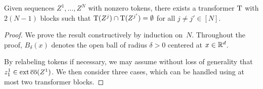 \documentclass[11pt,a4paper]{amsart}
\begin{document}
\begin{lemma}\label{lem:splitOverlappingSequences}
Given sequences $Z^1,\ldots,Z^N$ with nonzero tokens, there exists a transformer $\operatorname{\mathrm{T}}$ with $2 (N-1)$ blocks such that $\operatorname{\mathrm{T}}({Z}^j) \cap \operatorname{\mathrm{T}}({Z}^{j'}) = \emptyset$ for all $j\neq j'\in [N]$.
\end{lemma}
\begin{proof}
We prove the result constructively by induction on~$N$. Throughout the proof, $B_\delta(x)$ denotes the open ball of radius $\delta > 0$ centered at $x\in \mathbb{R}^d$.
\vspace{3mm}

 By relabeling tokens if necessary, we may assume without loss of generality that $z_1^1 \in \operatorname{ext}\operatorname{\overline{co}}(Z^1)$. We then consider three cases, which can be handled using at most two transformer blocks.


\end{proof}
\end{document}

